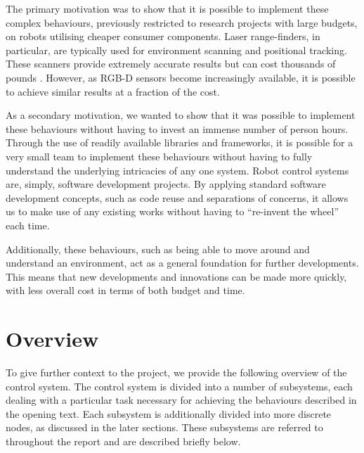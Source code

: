 The primary motivation was to show that it is possible to implement these complex behaviours, previously restricted to research projects with large budgets, on robots utilising cheaper consumer components. Laser range-finders, in particular, are typically used for environment scanning and positional tracking. These scanners provide extremely accurate results but can cost thousands of pounds \cite{laserscanner}. However, as RGB-D sensors become increasingly available, it is possible to achieve similar results at a fraction of the cost.

As a secondary motivation, we wanted to show that it was possible to implement these behaviours without having to invest an immense number of person hours. Through the use of readily available libraries and frameworks, it is possible for a very small team to implement these behaviours without having to fully understand the underlying intricacies of any one system. Robot control systems are, simply, software development projects. By applying standard software development concepts, such as code reuse and separations of concerns, it allows us to make use of any existing works without having to ``re-invent the wheel'' each time.

Additionally, these behaviours, such as being able to move around and understand an environment, act as a general foundation for further developments. This means that new developments and innovations can be made more quickly, with less overall cost in terms of both budget and time.

\section{Overview}

To give further context to the project, we provide the following overview of the control system. The control system is divided into a number of subsystems, each dealing with a particular task necessary for achieving the behaviours described in the opening text. Each subsystem is additionally divided into more discrete nodes, as discussed in the later sections. These subsystems are referred to throughout the report and are described briefly below.

